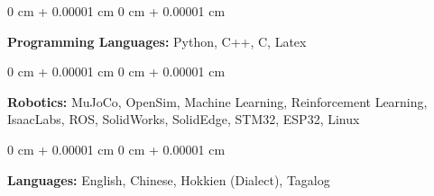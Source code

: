 \documentclass[10pt, letterpaper]{article}
\newenvironment{onecolentry}{
    \begin{adjustwidth}{
        0 cm + 0.00001 cm
    }{
        0 cm + 0.00001 cm
    }
}{
    \end{adjustwidth}
} %
\begin{document}
        
        \begin{onecolentry}
            \textbf{Programming Languages:} Python, C++, C, Latex
        \end{onecolentry}

        \vspace{0.2 cm}

        \begin{onecolentry}
            \textbf{Robotics:} MuJoCo, OpenSim, Machine Learning, Reinforcement Learning, IsaacLabs, ROS, SolidWorks, SolidEdge, STM32, ESP32, Linux
        \end{onecolentry}

        \vspace{0.2 cm}

        \begin{onecolentry}
            \textbf{Languages:} English, Chinese, Hokkien (Dialect), Tagalog
        \end{onecolentry}


    
\end{document}
